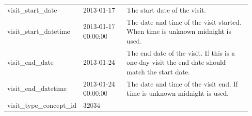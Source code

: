 \documentclass[]{book}
\begin{document}
\begin{longtable}[]{@{}lll@{}}
\begin{minipage}[t]{0.25\columnwidth}
visit\_start\_date\strut
\end{minipage} & \begin{minipage}[t]{0.17\columnwidth}\raggedright
2013-01-17\strut
\end{minipage} & \begin{minipage}[t]{0.50\columnwidth}\raggedright
The start date of the visit.\strut
\end{minipage}\tabularnewline
\begin{minipage}[t]{0.25\columnwidth}\raggedright
visit\_start\_datetime\strut
\end{minipage} & \begin{minipage}[t]{0.17\columnwidth}\raggedright
2013-01-17 00:00:00\strut
\end{minipage} & \begin{minipage}[t]{0.50\columnwidth}\raggedright
The date and time of the visit started. When time is unknown midnight is used.\strut
\end{minipage}\tabularnewline
\begin{minipage}[t]{0.25\columnwidth}\raggedright
visit\_end\_date\strut
\end{minipage} & \begin{minipage}[t]{0.17\columnwidth}\raggedright
2013-01-24\strut
\end{minipage} & \begin{minipage}[t]{0.50\columnwidth}\raggedright
The end date of the visit. If this is a one-day visit the end date should match the start date.\strut
\end{minipage}\tabularnewline
\begin{minipage}[t]{0.25\columnwidth}\raggedright
visit\_end\_datetime\strut
\end{minipage} & \begin{minipage}[t]{0.17\columnwidth}\raggedright
2013-01-24 00:00:00\strut
\end{minipage} & \begin{minipage}[t]{0.50\columnwidth}\raggedright
The date and time of the visit end. If time is unknown midnight is used.\strut
\end{minipage}\tabularnewline
\begin{minipage}[t]{0.25\columnwidth}\raggedright
visit\_type\_concept\_id\strut
\end{minipage} & \begin{minipage}[t]{0.17\columnwidth}\raggedright
32034\strut
\end{minipage} & \begin{minipage}[t]{0.50\columnwidth}\raggedright

\end{minipage}
\end{longtable}
\end{document}
